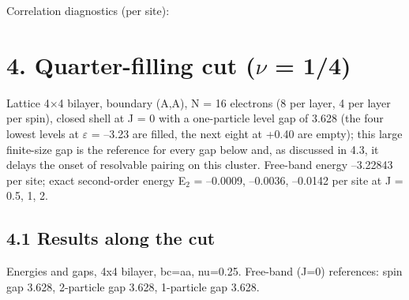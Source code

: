\documentclass[10pt]{article}
\begin{document}
Correlation diagnostics (per site):

\begin{center}\footnotesize\setlength{\tabcolsep}{3pt}
\end{center}

\section*{4. Quarter-filling cut ($\nu$ = 1/4)}

Lattice 4$\times$4 bilayer, boundary (A,A), N = 16 electrons (8 per layer, 4 per layer per spin), closed shell at J = 0 with a one-particle level gap of 3.628 (the four lowest levels at $\varepsilon$ = --3.23 are filled, the next eight at +0.40 are empty); this large finite-size gap is the reference for every gap below and, as discussed in 4.3, it delays the onset of resolvable pairing on this cluster. Free-band energy --3.22843 per site; exact second-order energy E$_2$ = --0.0009, --0.0036, --0.0142 per site at J = 0.5, 1, 2.

\subsection*{4.1 Results along the cut}

Energies and gaps, 4x4 bilayer, bc=aa, nu=0.25. Free-band (J=0) references: spin gap 3.628, 2-particle gap 3.628, 1-particle gap 3.628.
\end{document}
